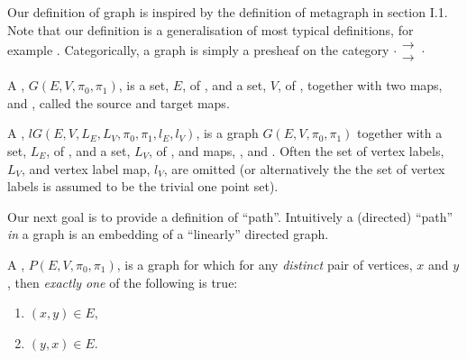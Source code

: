 \documentclass[a4paper,openany]{amsart}
\begin{document}
Our definition of graph is inspired by the definition of metagraph in
\cite{macLane1971categoriesWorkingMathematician} section I.1. Note that our definition is
a generalisation of most typical definitions, for example \cite[section
1.1]{diestel2006graphTheory}. Categorically, a graph is simply a presheaf on the category
$ \cdot \substack{\mathbf{\longrightarrow} \\[-0.7ex] \mathbf{\longrightarrow}} \cdot $

\begin{definition}

A , $G(E, V, \pi_0, \pi_1)$, is a set, $E$, of
, and a set, $V$, of , together with two maps, 
 and , called the source and target maps.

A , $lG(E, V, L_E, L_V, \pi_0, \pi_1, l_E, l_V)$, is a graph $G(E, 
V, \pi_0, \pi_1)$ together with a set, $L_E$, of , and a set, $L_V$, 
of , and maps, , and . Often the 
set of vertex labels, $L_V$, and vertex label map, $l_V$, are omitted (or 
alternatively the the set of vertex labels is assumed to be the trivial one point set).

\end{definition}



Our next goal is to provide a definition of ``path''. Intuitively a (directed) ``path''
\emph{in} a graph is an embedding of a ``linearly'' directed graph.

\begin{definition}

A , $P(E, V, \pi_0, \pi_1)$, is a graph for which for any
\emph{distinct} pair of vertices, $x$ and $y$, then \emph{exactly one} of the following is
true:

\begin{enumerate}
\item $(x,y) \in E$, 
\item $(y,x) \in E$.
\end{enumerate}

\end{definition}
\end{document}
